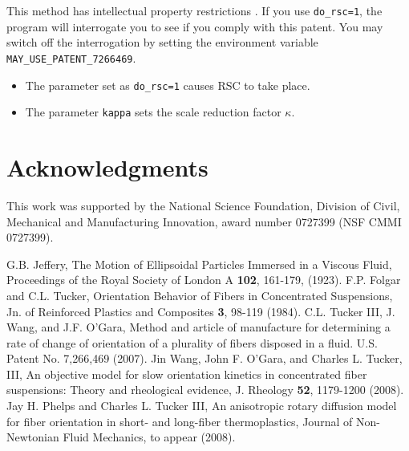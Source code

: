 \documentclass{amsart}
\begin{document}
This method has intellectual property restrictions \cite{rsc-pat}.  If you use {\tt do\_rsc=1}, the program will interrogate you to see if you comply with this patent.  You may switch off the interrogation by setting the environment variable {\tt MAY\_USE\_PATENT\_7266469}.

\begin{itemize}
\item The parameter set as {\tt do\_rsc=1} causes RSC to take place.
\item The parameter {\tt kappa} sets the scale reduction factor $\kappa$.
\end{itemize}

\section*{Acknowledgments}

\noindent
This work was supported by the National Science Foundation, Division of Civil, Mechanical and Manufacturing Innovation, award number 0727399 (NSF CMMI 0727399).

\begin{thebibliography}{99}
G.B. Jeffery, The Motion of Ellipsoidal Particles Immersed in a Viscous Fluid, Proceedings of the Royal Society of London A {\bf 102}, 161-179, (1923).
F.P. Folgar and C.L. Tucker, Orientation Behavior of Fibers in Concentrated Suspensions, Jn. of Reinforced Plastics and Composites {\bf 3}, 98-119 (1984).
C.L. Tucker III, J. Wang, and J.F. O'Gara, Method and article of manufacture for determining a rate of change of orientation of a plurality of fibers disposed in a fluid. U.S. Patent No. 7,266,469 (2007).
Jin Wang, John F. O'Gara, and Charles L. Tucker, III, An objective model for slow orientation kinetics in concentrated fiber suspensions: Theory and rheological evidence, J. Rheology {\bf 52}, 1179-1200 (2008).
Jay H. Phelps and Charles L. Tucker III, An anisotropic rotary diffusion model for fiber orientation in short- and long-fiber thermoplastics, Journal of Non-Newtonian Fluid Mechanics, to appear (2008).
\end{thebibliography}
\end{document}
